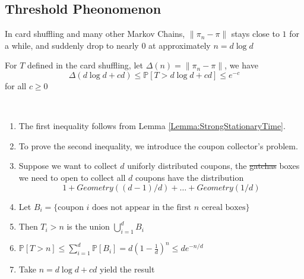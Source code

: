     \subsection{Threshold Pheonomenon}
        In card shuffling and many other Markov Chains, $\|\pi_n - \pi\|$ stays close to $1$ for a while, and suddenly drop to nearly $0$ at approximately $n = d\log{d}$

        \begin{theorem}
            For $T$ defined in the card shuffling, let $\Delta(n) = \|\pi_n - \pi\|$, we have
            \[ \Delta(d\log{d} + cd) \le \mathbb{P}[T > d\log{d} + cd] \le e^{-c} \]
            for all $c \ge 0$
        \end{theorem}
        \begin{sketchproof} ~{}
            \begin{enumerate}
                \item The first inequality follows from Lemma \ref{Lemma:StrongStationaryTime}.
                \item To prove the second inequality, we introduce the coupon collector's problem.
                \item Suppose we want to collect $d$ uniforly distributed coupons, the \sout{gatchas} boxes we need to open to collect all $d$ coupons have the distribution
                \[ 1 + Geometry((d-1)/d) + \dots + Geometry(1/d) \]
                \item Let $B_i = \{ \text{coupon $i$ does not appear in the first $n$ cereal boxes} \}$
                \item Then $T_i > n$ is the union $\bigcup_{i=1}^dB_i$
                \item $\mathbb{P}[T>n] \le \sum_{i=1}^d\mathbb{P}[B_i] = d\left(1 - \frac{1}{d}\right)^n \le de^{-n/d}$
                \item Take $n = d\log{d} + cd$ yield the result
            \end{enumerate}
        \end{sketchproof}
